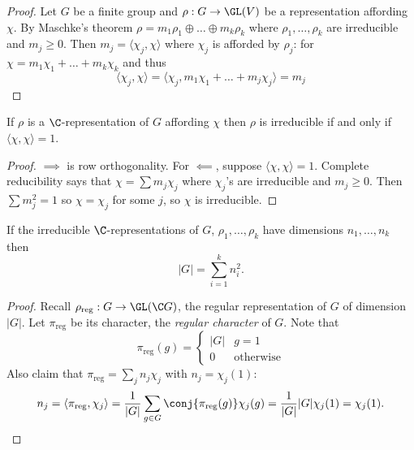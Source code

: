 \documentclass[a4paper]{article}
\theoremstyle{definition}
\begin{document}
\begin{proof}
  Let \(G\) be a finite group and \(\rho: G \to \GL(V)\) be a representation affording \(\chi\). By Maschke's theorem \(\rho = m_1 \rho_1 \oplus \dots \oplus m_k \rho_k\) where \(\rho_1, \dots, \rho_k\) are irreducible and \(m_j \geq 0\). Then \(m_j = \langle \chi_j, \chi \rangle\) where \(\chi_j\) is afforded by \(\rho_j\): for \(\chi = m_1 \chi_1 + \dots + m_k \chi_k\) and thus
  \[
    \langle \chi_j, \chi \rangle
    = \langle \chi_j, m_1 \chi_1 + \dots + m_j \chi_j \rangle
    = m_j
  \]
\end{proof}

\begin{corollary}
  If \(\rho\) is a \(\C\)-representation of \(G\) affording \(\chi\) then \(\rho\) is irreducible if and only if \(\langle \chi, \chi \rangle = 1\).
\end{corollary}

\begin{proof}
  \(\implies\) is row orthogonality. For \(\impliedby\), suppose \(\langle \chi, \chi \rangle = 1\). Complete reducibility says that \(\chi = \sum m_j \chi_j\) where \(\chi_j\)'s are irreducible and \(m_j \geq 0\). Then \(\sum m_j^2 = 1\) so \(\chi = \chi_j\) for some \(j\), so \(\chi\) is irreducible.
\end{proof}

\begin{theorem}
  If the irreducible \(\C\)-representations of \(G\), \(\rho_1, \dots, \rho_k\) have dimensions \(n_1, \dots, n_k\) then
  \[
    |G| = \sum_{i = 1}^k n_i^2.
  \]
\end{theorem}

\begin{proof}
  Recall \(\rho_{\text{reg}}: G \to \GL(\C G)\), the regular representation of \(G\) of dimension \(|G|\). Let \(\pi_{\text{reg}}\) be its character, the \emph{regular character} of \(G\). Note that
  \[
    \pi_{\text{reg}}(g) =
    \begin{cases}
      |G| & g = 1 \\
      0 & \text{otherwise}
    \end{cases}
  \]
  Also claim that \(\pi_{\text{reg}} = \sum_j n_j \chi_j\) with \(n_j = \chi_j(1)\):
  \[
    n_j
    = \langle \pi_{\text{reg}}, \chi_j \rangle
    = \frac{1}{|G|} \sum_{g \in G} \conj{\pi_{\text{reg}}(g)} \chi_j(g)
    = \frac{1}{|G|} |G| \chi_j(1)
    = \chi_j(1).
  \]
\end{proof}
\end{document}
